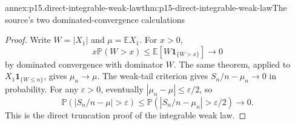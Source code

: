 \begin{annexitem}{annex:p15.direct-integrable-weak-law}{thm:p15-direct-integrable-weak-law}{The source's two dominated-convergence calculations}
\begin{proof}
Write \(W=|X_1|\) and \(\mu=\mathbb EX_1\).
For \(x>0\),
\[
 x\mathbb P(W>x)\leq\mathbb E[W\mathbf1_{\{W>x\}}]\longrightarrow0
\]
by dominated convergence with dominator \(W\).
The same theorem, applied to
\(X_1\mathbf1_{\{W\leq n\}}\), gives \(\mu_n\to\mu\).
The weak-tail criterion gives \(S_n/n-\mu_n\to0\) in probability.
For any \(\varepsilon>0\), eventually
\(|\mu_n-\mu|\leq\varepsilon/2\), so
\[
 \mathbb P(|S_n/n-\mu|>\varepsilon)
       \leq\mathbb P(|S_n/n-\mu_n|>\varepsilon/2)\longrightarrow0.
\]
This is the direct truncation proof of the integrable weak law.
\end{proof}
\end{annexitem}

